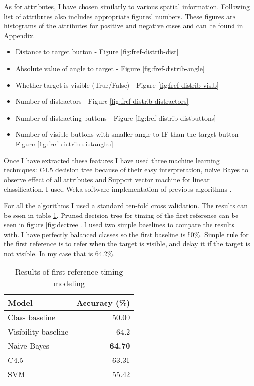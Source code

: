 As for attributes, I have chosen similarly to \citet{stoia2006sentence} various spatial information. Following list of attributes also includes appropriate figures' numbers. These figures are histograms of the attributes for positive and negative cases and can be found in Appendix.

\begin{itemize}
\item
Distance to target button - Figure \ref{fig:fref-distrib-dist}
\item
Absolute value of angle to target - Figure \ref{fig:fref-distrib-angle}
\item
Whether target is visible (True/False) - Figure \ref{fig:fref-distrib-visib}
\item
Number of distractors - Figure \ref{fig:fref-distrib-distractors}
\item
Number of distracting buttons - Figure \ref{fig:fref-distrib-distbuttons}
\item
Number of visible buttons with smaller angle to IF than the target button - Figure \ref{fig:fref-distrib-distangles}
\end{itemize}

Once I have extracted these features I have used three machine learning techniques: C4.5 decision tree because of their easy interpretation, naive Bayes to observe effect of all attributes and Support vector machine for linear classification. I used Weka software implementation of previous algorithms \citep{hall2009weka}.

For all the algorithms I used a standard ten-fold cross validation. The results can be seen in table \ref{tab:firstref}. Pruned decision tree for timing of the first reference can be seen in figure \ref{fig:dectree}. I used two simple baselines to compare the results with. I have perfectly balanced classes so the first baseline is 50\%. Simple rule for the first reference is to refer when the target is visible, and delay it if the target is not visible. In my case that is 64.2\%. 

\begin{table}[h!]
\begin{tabular}{lr}
\toprule
Model    & Accuracy (\%)  \\
\midrule
Class baseline    & 50.00\\
Visibility baseline & 64.2\\
\midrule
Naive Bayes  & \textbf{64.70} \\
C4.5 & 63.31 \\
SVM & 55.42 \\
\bottomrule
\end{tabular}
\caption{Results of first reference timing modeling}
\label{tab:firstref}
\end{table}

